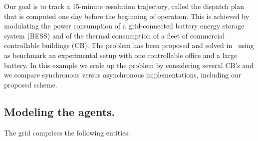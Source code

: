 \documentclass[envcountsect]{svjour3}
\begin{document}
Our goal is to track a 15-minute resolution trajectory, called the dispatch plan that is computed one day before the beginning of operation. This is achieved by modulating the power consumption of a grid-connected battery energy storage system (BESS) and of the thermal consumption of a fleet of commercial controllable buildings (CB). The problem has been proposed and solved in~\cite{EPFL-CONF-226792} using as benchmark an experimental setup with one controllable office and a large battery. In this example we scale up the problem by considering several CB's and we compare synchronous versus asynchronous implementations, including our proposed scheme.

\subsection{Modeling the agents. }
The grid comprises the following entities:
\end{document}
